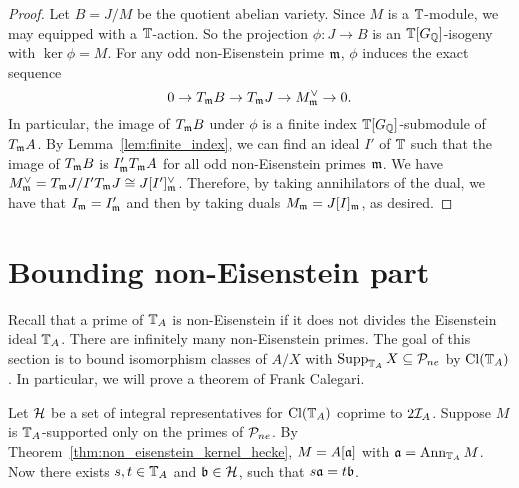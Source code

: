 \documentclass[thesis.tex]{subfiles}
\begin{document}
\begin{proof}
Let $B=J/M$ be the quotient abelian variety. Since $M$ is a $\TT$-module,
we may equipped with a $\TT$-action. So the projection $\phi:J \to B$ is an
$\TT[G_\QQ]$-isogeny with $\ker\phi = M$. For any odd non-Eisenstein prime
$\m$, $\phi$ induces the exact sequence
\[
    0 \to T_\m B \to T_\m J \to M^\vee _\m \to 0.
\]
In particular, the image of $T_\m B$ under $\phi$ is a finite index
$\TT[G_\QQ]$-submodule of $T_\m A$. By Lemma~\ref{lem:finite_index}, we can find
an ideal $I'$ of $\TT$ such that the image of $T_\m B$ is $I' _\m T_\m A$
for all odd non-Eisenstein primes $\m$. We have $M^\vee _\m = T_\m J / I'
T_\m J\cong J[I']_\m ^\vee$. Therefore, by taking annihilators of the dual,
we have that $I_\m = I'_\m$ and then by taking duals $M_\m = J[I]_\m$, as
desired.
\end{proof}

\section{Bounding non-Eisenstein part}%
\label{sec:bounding_non_eisenstein_part}

Recall that a prime of $\TT_A$ is non-Eisenstein if it does not divides the
Eisenstein ideal $\TT_A$. There are infinitely many non-Eisenstein primes. The
goal of this section is to bound isomorphism classes of $A/X$ with
$\Supp_{\TT_A} X\subseteq \P_{ne}$ by $\Cl(\TT_A)$. In particular, we will
prove a theorem of Frank Calegari.

Let $\H$ be a set of integral representatives for $\Cl(\TT_A)$ coprime to
$2\I_A$. Suppose $M$ is $\TT_A$-supported only on the primes of $\P_{ne}$. By
Theorem~\ref{thm:non_eisenstein_kernel_hecke}, $M=A[\a]$ with $\a=\Ann_{\TT_A}
M$. Now there exists $s,t\in \TT_A$ and $\b \in \H$, such that $s\a=t\b$.
\end{document}
